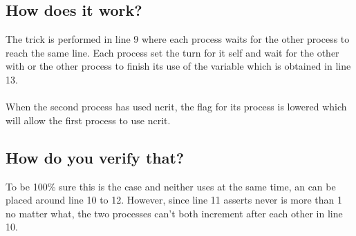 \documentclass[Main]{subfiles}
\begin{document}
\subsection{How does it work?}

The  trick is performed in line 9 where each process waits for the other process to reach the same line.
Each process set the turn for it self and wait for the other with  or the other process to finish its use of the variable  which is obtained in line 13.
\\
\\
When the second process has used ncrit, the flag for its process is lowered which will allow the first process to use ncrit.

\subsection{How do you verify that?}
To be 100\% sure this is the case and neither uses  at the same time, an  can be placed around line 10 to 12.
However, since line 11 asserts  never is more than 1 no matter what, the two processes can't both increment after each other in line 10.
\end{document}
